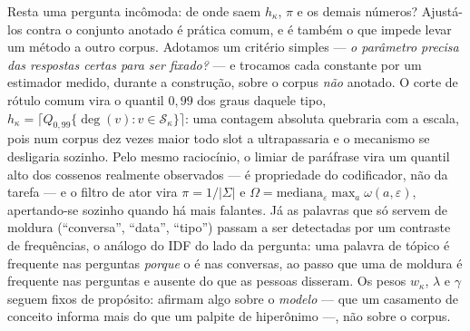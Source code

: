 Resta uma pergunta incômoda: de onde saem $h_\kappa$, $\pi$ e os demais números?
Ajustá-los contra o conjunto anotado é prática comum, e é também o que impede levar
um método a outro corpus. Adotamos um critério simples --- \emph{o parâmetro
precisa das respostas certas para ser fixado?} --- e trocamos cada constante por um
estimador medido, durante a construção, sobre o corpus \emph{não} anotado. O corte de rótulo comum vira o quantil $0{,}99$ dos graus
daquele tipo, $h_\kappa=\lceil Q_{0,99}\{\deg(v):v\in\mathcal{S}_\kappa\}\rceil$:
uma contagem absoluta quebraria com a escala, pois num corpus dez vezes maior todo
slot a ultrapassaria e o mecanismo se desligaria sozinho. Pelo mesmo raciocínio, o
limiar de paráfrase vira um quantil alto dos cossenos realmente observados --- é
propriedade do codificador, não da tarefa --- e o filtro de ator vira
$\pi=1/|\Sigma|$ e $\Omega=\mathrm{mediana}_\varepsilon\max_a\omega(a,\varepsilon)$,
apertando-se sozinho quando há mais falantes. Já as palavras que só servem de
moldura (``conversa'', ``data'', ``tipo'') passam a ser detectadas por um contraste
de frequências, o análogo do IDF do lado da pergunta: uma palavra de tópico é
frequente nas perguntas \emph{porque} o é nas conversas, ao passo que uma de
moldura é frequente nas perguntas e ausente do que as pessoas disseram. Os pesos $w_\kappa$, $\lambda$ e $\gamma$ seguem fixos de propósito: afirmam algo
sobre o \emph{modelo} --- que um casamento de conceito informa mais do que um
palpite de hiperônimo ---, não sobre o corpus.

